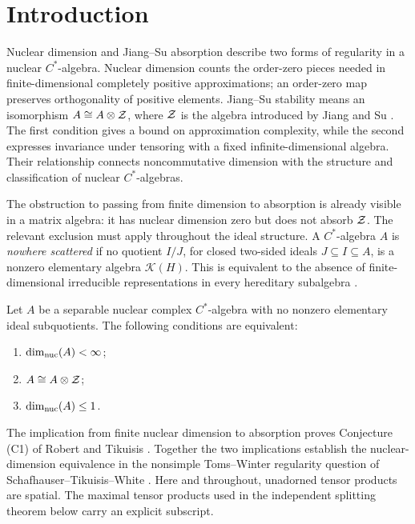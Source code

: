 \section{Introduction}
\label{sec:introduction}

Nuclear dimension and Jiang--Su absorption describe two forms of
regularity in a nuclear $C^*$-algebra. Nuclear dimension counts the
order-zero pieces needed in finite-dimensional completely positive
approximations; an order-zero map preserves orthogonality of positive
elements. Jiang--Su stability means an isomorphism
$A\cong A\otimes\mathcal Z$, where $\mathcal Z$ is the algebra introduced by Jiang and Su \cite{JS}. The first
condition gives a bound on approximation complexity, while the second
expresses invariance under tensoring with a fixed infinite-dimensional
algebra. Their relationship connects noncommutative dimension with
the structure and classification of nuclear $C^*$-algebras.

The obstruction to passing from finite dimension to absorption is
already visible in a matrix algebra: it has nuclear dimension zero
but does not absorb $\mathcal Z$. The relevant exclusion must apply throughout
the ideal structure. A $C^*$-algebra $A$ is \emph{nowhere scattered}
if no quotient $I/J$, for closed two-sided ideals $J\subseteq I\subseteq A$,
is a nonzero elementary algebra $\mathcal K(H)$. This is equivalent
to the absence of finite-dimensional irreducible representations in
every hereditary subalgebra \cite[Theorem~3.1]{TV}.

\begin{theorem}
\label{thm:main}
\label{intro:regularity}
Let $A$ be a separable nuclear complex $C^*$-algebra with no nonzero
elementary ideal subquotients. The following conditions are equivalent:
\begin{enumerate}
\item $\dim_{\mathrm{nuc}}(A)<\infty$;
\item $A\cong A\otimes\mathcal Z$;
\item $\dim_{\mathrm{nuc}}(A)\le1$.
\end{enumerate}
\end{theorem}

The implication from finite nuclear dimension to absorption proves
Conjecture (C1) of Robert and Tikuisis \cite{RT}. Together the two
implications establish the nuclear-dimension equivalence in the
nonsimple Toms--Winter regularity question of
Schafhauser--Tikuisis--White
\cite[Section~22, Problem~LXXV]{STW99}.
Here and throughout, unadorned tensor products are spatial. The
maximal tensor products used in the independent splitting theorem
below carry an explicit subscript.

